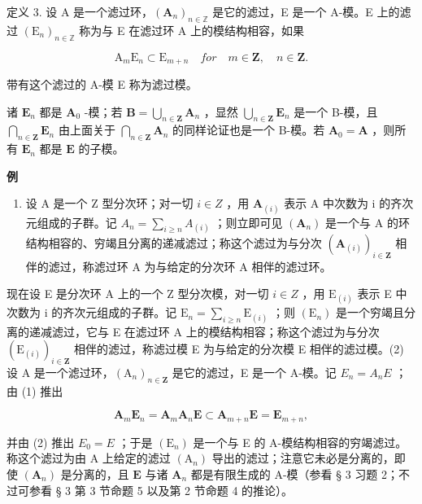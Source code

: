 定义 3. 设 A 是一个滤过环，\((\mathbf{A}_n)_{n\in \mathbb{Z}}\) 是它的滤过，E 是一个 A-模。E 上的滤过 \((\mathrm{E}_n)_{n\in \mathbb{Z}}\) 称为与 E 在滤过环 A 上的模结构相容，如果

\[
\mathrm{A} _ {m} \mathrm{E} _ {n} \subset \mathrm{E} _ {m + n} \quad for \quad m \in \mathbf {Z}, \quad n \in \mathbf {Z}.\tag{3}
\]

带有这个滤过的 A-模 E 称为滤过模。

诸 \(\mathbf{E}_n\) 都是 \(\mathbf{A}_0\) -模；若 \(\mathbf{B} = \bigcup_{n \in \mathbf{Z}} \mathbf{A}_n\) ，显然 \(\bigcup_{n \in \mathbf{Z}} \mathbf{E}_n\) 是一个 B-模，且 \(\bigcap_{n \in \mathbf{Z}} \mathbf{E}_n\) 由上面关于 \(\bigcap_{n \in \mathbf{Z}} \mathbf{A}_n\) 的同样论证也是一个 B-模。若 \(\mathbf{A}_0 = \mathbf{A}\) ，则所有 \(\mathbf{E}_n\) 都是 \(\mathbf{E}\) 的子模。

\textbf{例}\par

\begin{enumerate}
\def\labelenumi{(\arabic{enumi})}
\tightlist
\item
  设 A 是一个 Z 型分次环；对一切 \(i \in Z\) ，用 \(\mathbf{A}_{(i)}\) 表示 A 中次数为 i 的齐次元组成的子群。记 \(A_{n} = \sum_{i \geq n} A_{(i)}\) ；则立即可见 \((\mathbf{A}_{n})\) 是一个与 A 的环结构相容的、穷竭且分离的递减滤过；称这个滤过为与分次 \((\mathbf{A}_{(i)})_{i \in \mathbf{Z}}\) 相伴的滤过，称滤过环 A 为与给定的分次环 A 相伴的滤过环。
\end{enumerate}

现在设 E 是分次环 A 上的一个 Z 型分次模，对一切 \(i \in Z\) ，用 \(\mathrm{E}_{(i)}\) 表示 E 中次数为 i 的齐次元组成的子群。记 \(\mathrm{E}_{n} = \sum_{i \geqslant n} \mathrm{E}_{(i)}\) ；则 \((\mathrm{E}_{n})\) 是一个穷竭且分离的递减滤过，它与 E 在滤过环 A 上的模结构相容；称这个滤过为与分次 \((\mathrm{E}_{(i)})_{i \in \mathbf{Z}}\) 相伴的滤过，称滤过模 E 为与给定的分次模 E 相伴的滤过模。(2) 设 A 是一个滤过环，\((\mathrm{A}_{n})_{n \in \mathbf{Z}}\) 是它的滤过，E 是一个 A-模。记 \(E_{n} = A_{n}E\) ；由 (1) 推出

\[
\mathbf {A} _ {m} \mathbf {E} _ {n} = \mathbf {A} _ {m} \mathbf {A} _ {n} \mathbf {E} \subset \mathbf {A} _ {m + n} \mathbf {E} = \mathbf {E} _ {m + n},
\]

并由 (2) 推出 \(E_{0} = E\) ；于是 \((\mathrm{E}_{n})\) 是一个与 E 的 A-模结构相容的穷竭滤过。称这个滤过为由 A 上给定的滤过 \((\mathrm{A}_{n})\) 导出的滤过；注意它未必是分离的，即使 \((\mathbf{A}_n)\) 是分离的，且 \(\mathbf{E}\) 与诸 \(\mathbf{A}_n\) 都是有限生成的 A-模（参看 § 3 习题 2；不过可参看 § 3 第 3 节命题 5 以及第 2 节命题 4 的推论）。

